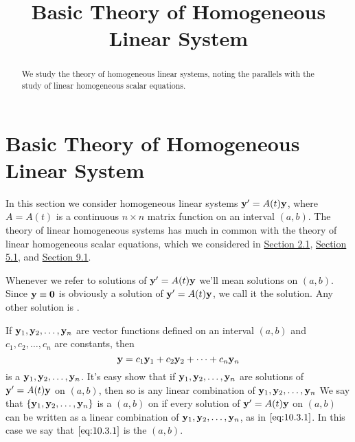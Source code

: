 \documentclass{ximera}
\title{Basic Theory of Homogeneous Linear System}%
\begin{document}
\begin{abstract}
We study the theory of homogeneous linear systems, noting the parallels with the study of linear homogeneous scalar equations.
\end{abstract}

\maketitle

\section*{Basic Theory of Homogeneous Linear System}

In this section we consider homogeneous linear systems ${\bf y}'=
A(t){\bf y}$, where $A=A(t)$ is a continuous $n\times n$ matrix
function on an interval $(a,b)$. The theory of linear homogeneous
systems has much in common with the theory of linear homogeneous
scalar equations, which we considered in
\href{https://xerxes.ximera.org/differentialequations/main/linearFirstOrderDiffEq/linearFirstOrderDiffEq}{Section 2.1}, \href{https://xerxes.ximera.org/differentialequations/main/homogeneousLinearEquations/homogeneousLinearEquations}{Section 5.1}, and \href{https://xerxes.ximera.org/differentialequations/main/linearHigherOrder/linearHigherOrder}{Section 9.1}.

Whenever we refer to solutions of ${\bf y}'=A(t){\bf y}$ we'll mean
solutions on $(a,b)$. Since ${\bf y}\equiv{\bf 0}$ is obviously a
solution of ${\bf y}'=A(t){\bf y}$, we call it the 
solution. Any other solution is .

If ${\bf y}_1, {\bf y}_2, \dots, {\bf y}_n$ are vector functions
defined on an interval $(a,b)$ and $c_1, c_2, \dots, c_n$ are
constants, then
\begin{equation} \label{eq:10.3.1}
{\bf y}=c_1{\bf y}_1+c_2{\bf y}_2+\cdots+c_n{\bf y}_n
\end{equation}
is a  ${\bf y}_1, {\bf y}_2, \ldots,{\bf
y}_n$. It's easy show that if ${\bf
y}_1, {\bf y}_2, \dots,{\bf y}_n$ are solutions of ${\bf y}'=A(t){\bf
y}$ on $(a,b)$, then so is any linear combination of
 ${\bf y}_1, {\bf y}_2, \dots, {\bf y}_n$ %
 We say that
$\{{\bf y}_1,{\bf y}_2,\dots,{\bf y}_n\}$ is a  $(a,b)$ on if every solution of
${\bf y}'=A(t){\bf y}$ on $(a,b)$ can be written as a linear combination of
${\bf y}_1, {\bf y}_2, \dots, {\bf y}_n$, as in $\eqref{eq:10.3.1}$.
In this
case we say that $\eqref{eq:10.3.1}$ is the  $(a,b)$.
\end{document}
